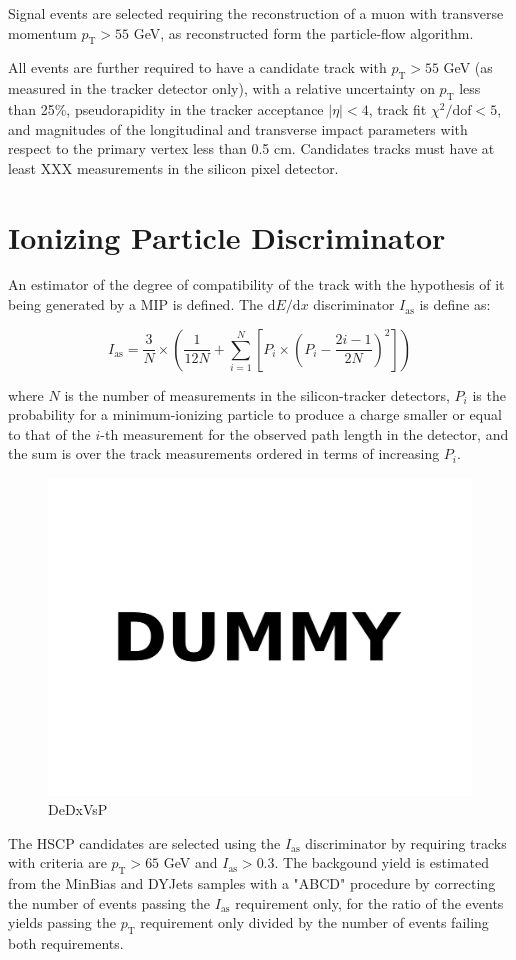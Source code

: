 \documentclass[11pt,twoside,a4paper]{article}
\begin{document}
Signal events are selected requiring the reconstruction of a muon with transverse momentum $p_{\mathrm{T}} > 55$ GeV, as reconstructed form the particle-flow algorithm.

All events are further required to have a candidate track with $p_{\mathrm{T}} > 55$ GeV (as measured in the tracker detector only), with a relative uncertainty on $p_{\mathrm{T}}$ less than 25\%, pseudorapidity in the tracker acceptance $|\eta| < 4$, track fit $\chi^2/\mathrm{dof} < 5$, and magnitudes of the longitudinal and transverse impact parameters with respect to the primary vertex less than 0.5 cm. 
Candidates tracks must have at least XXX measurements in the silicon pixel detector.

\section{Ionizing Particle Discriminator}

An estimator of the degree of compatibility of the track with the hypothesis of it being generated by a MIP is defined.
The $\mathrm{d}E/\mathrm{d}x$ discriminator $I_{\mathrm{as}}$ is define as:

$$
I_{\mathrm{as}} = \frac{3}{N} \times \left( \frac{1}{12N} + \sum_{i=1}^{N} \left[ P_i \times \left( P_i - \frac{2i-1}{2N} \right)^2 \right] \right)
$$

where $N$ is the number of measurements in the silicon-tracker detectors, $P_i$ is the probability for a minimum-ionizing particle to produce a charge smaller or equal to that of the $i$-th measurement for the observed path length in the detector, and the sum is over the track measurements ordered in terms of increasing $P_i$.

\begin{figure}
\centering
\includegraphics[width=.5\textwidth]{figures/dummy.pdf}
\caption{DeDxVsP\label{fig:dedxvsp}}
\end{figure}

The HSCP candidates are selected using the $I_{\mathrm{as}}$ discriminator by requiring tracks with  criteria are $p_{\mathrm{T}} > 65$ GeV and $I_{\mathrm{as}} > 0.3$. 
The backgound yield is estimated from the MinBias and DYJets samples with a "ABCD" procedure by correcting the number of events passing the $I_{\mathrm{as}}$ requirement only, for the ratio of the events yields passing the $p_{\mathrm{T}}$ requirement only divided by the number of events failing both requirements.
\end{document}
